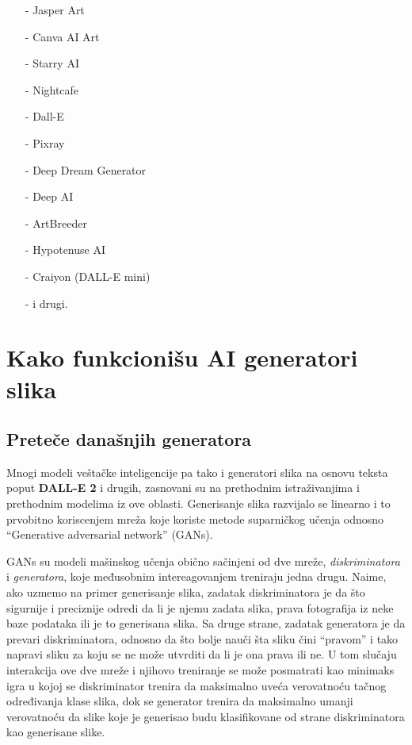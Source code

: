 \documentclass[12pt, letterpaper]{article}
\begin{document}
\begin{itemize} 

\item[-] Jasper Art 

\item[-] Canva AI Art 

\item[-] Starry AI 

\item[-] Nightcafe 

\item[-] Dall-E 

\item[-] Pixray 

\item[-] Deep Dream Generator 

\item[-] Deep AI 

\item[-] ArtBreeder 

\item[-] Hypotenuse AI 

\item[-] Craiyon (DALL-E mini) 

\item[-] i drugi. 

\end{itemize} 

\cite{kljucTri} 

\pagebreak
\section{Kako funkcionišu AI generatori slika}
\subsection*{Preteče današnjih generatora}
Mnogi modeli veštačke inteligencije pa tako i generatori slika na osnovu teksta poput \textbf{DALL-E 2} i drugih, zasnovani su na prethodnim istraživanjima i prethodnim modelima iz ove oblasti.
Generisanje slika razvijalo se linearno i to prvobitno koriscenjem mreža koje koriste metode suparničkog učenja odnosno “Generative adversarial network” (GANs).

GANs su modeli mašinskog učenja obično sačinjeni od dve mreže, \textit{diskriminatora} i \textit{generatora}, koje međusobnim intereagovanjem treniraju jedna drugu. Naime, ako uzmemo na primer generisanje slika, zadatak diskriminatora je da što sigurnije i preciznije odredi da li je njemu zadata slika, prava fotografija iz neke baze podataka ili je to generisana slika. Sa druge strane, zadatak generatora je da prevari diskriminatora, odnosno da što bolje nauči šta sliku čini “pravom” i tako napravi sliku za koju se ne može utvrditi da li je ona prava ili ne. U tom slučaju interakcija ove dve mreže i njihovo treniranje se može posmatrati kao minimaks igra u kojoj se diskriminator trenira da maksimalno uveća verovatnoću tačnog određivanja klase slika, dok se generator trenira da maksimalno umanji verovatnoću da slike koje je generisao budu klasifikovane od strane diskriminatora kao generisane slike.\cite{gan1, gan2, ganvideo}
\end{document}
